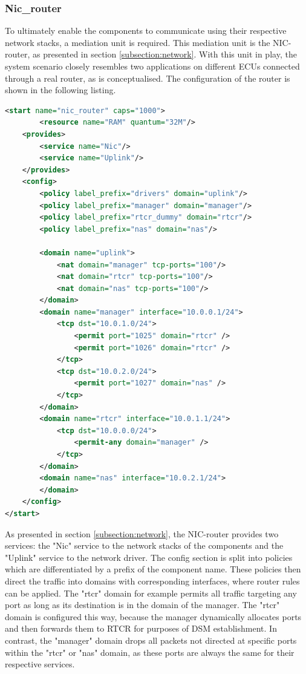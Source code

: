 \subsubsection{Nic\_router}
To ultimately enable the components to communicate using their respective network stacks, a mediation unit is required. This mediation unit is the NIC-router, as presented in section \ref{subsection:network}. With this unit in play, the system scenario closely resembles two applications on different ECUs connected through a real router, as is conceptualised. The configuration of the router is shown in the following listing.
\begin{lstlisting}[language=XML, caption={Configuration of the NIC-router component.}] 
<start name="nic_router" caps="1000">
    	<resource name="RAM" quantum="32M"/>
	<provides>
		<service name="Nic"/>
		<service name="Uplink"/>
	</provides>
	<config>
	    <policy label_prefix="drivers" domain="uplink"/>
		<policy label_prefix="manager" domain="manager"/>
		<policy label_prefix="rtcr_dummy" domain="rtcr"/>
		<policy label_prefix="nas" domain="nas"/>

		<domain name="uplink">
			<nat domain="manager" tcp-ports="100"/>
			<nat domain="rtcr" tcp-ports="100"/>
			<nat domain="nas" tcp-ports="100"/>
		</domain>
		<domain name="manager" interface="10.0.0.1/24">
		    <tcp dst="10.0.1.0/24">
		        <permit port="1025" domain="rtcr" />
		        <permit port="1026" domain="rtcr" />
		    </tcp>
		    <tcp dst="10.0.2.0/24">
		        <permit port="1027" domain="nas" />
		    </tcp>
		</domain>
		<domain name="rtcr" interface="10.0.1.1/24">
			<tcp dst="10.0.0.0/24">
			    <permit-any domain="manager" />
			</tcp>
		</domain>
		<domain name="nas" interface="10.0.2.1/24">
		</domain>
	</config>
</start>
\end{lstlisting}
As presented in section \ref{subsection:network}, the NIC-router provides two services: the "Nic" service to the network stacks of the components and the "Uplink" service to the network driver. The config section is split into policies which are differentiated by a prefix of the component name. These policies then direct the traffic into domains with corresponding interfaces, where router rules can be applied. The "rtcr" domain for example permits all traffic targeting any port as long as its destination is in the domain of the manager. The "rtcr" domain is configured this way, because the manager dynamically allocates ports and then forwards them to RTCR for purposes of DSM establishment. In contrast, the "manager" domain drops all packets not directed at specific ports within the "rtcr" or "nas" domain, as these ports are always the same for their respective services. \cite{nic_readme}

